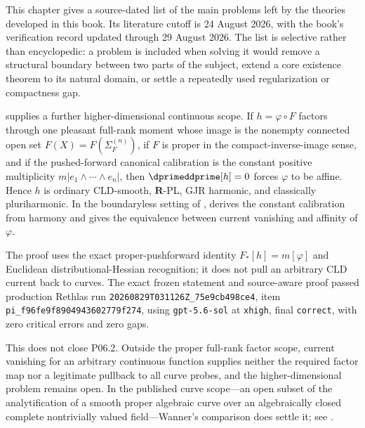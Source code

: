 
This chapter gives a source-dated list of the main problems left by the
theories developed in this book.  Its literature cutoff is 24 August 2026,
with the book's verification record updated through 29 August 2026.  The list
is selective rather than encyclopedic: a problem is included when solving it
would remove a structural boundary between two parts of the subject, extend a
core existence theorem to its natural domain, or settle a repeatedly used
regularization or compactness gap.

 supplies a further
higher-dimensional continuous scope.  If $h=\varphi\circ F$ factors through
one pleasant full-rank moment whose image is the nonempty connected open set
$F(X)=F(\Sigma_F^{(n)})$, if $F$ is proper in the compact-inverse-image
sense, and if the pushed-forward canonical calibration is the constant
positive multiplicity $m|e_1\wedge\cdots\wedge e_n|$, then
$\dprimeddprime[h]=0$ forces $\varphi$ to be affine.  Hence $h$ is ordinary
CLD-smooth, $\mathbf R$-PL, GJR harmonic, and classically pluriharmonic.  In
the boundaryless setting of ,
 derives the
constant calibration from harmony and gives the equivalence between current
vanishing and affinity of $\varphi$.

The proof uses the exact proper-pushforward identity
$F_*[h]=m[\varphi]$ and Euclidean distributional-Hessian recognition; it does
not pull an arbitrary CLD current back to curves.  The exact frozen statement
and source-aware proof passed production Rethlas run
\nolinkurl{20260829T031126Z_75e9cb498ce4}, item
\nolinkurl{pi_f96fe9f8904943602779f274}, using
\texttt{gpt-5.6-sol} at \texttt{xhigh}, final \texttt{correct}, with zero
critical errors and zero gaps.

This does not close P06.2.  Outside the proper full-rank factor scope,
current vanishing for an arbitrary continuous function supplies neither the
required factor map nor a legitimate pullback to all curve probes, and the
higher-dimensional problem remains open.  In the published curve scope---an
open subset of the analytification of a smooth proper algebraic curve over an
algebraically closed complete nontrivially valued field---Wanner's comparison
does settle it; see
.

